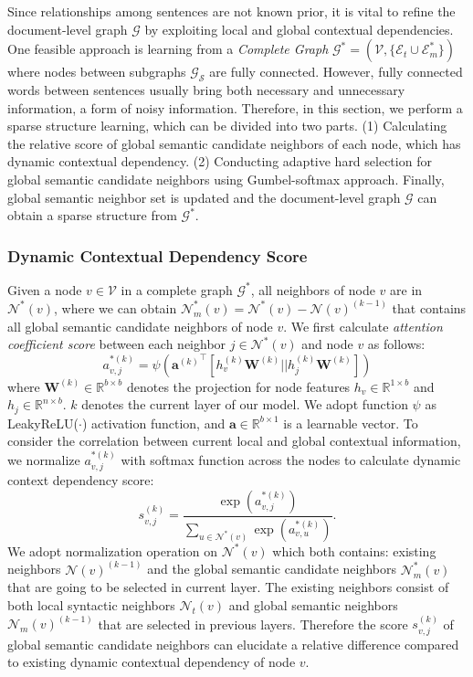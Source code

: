 \documentclass[letterpaper]{article} %
\begin{document}
Since relationships among sentences are not known prior, it is vital to refine the document-level graph $\mathcal{G}$ by exploiting local and global contextual dependencies. One feasible approach is learning from a  \textit{Complete Graph} $\mathcal{G^*}=(\mathcal{V},\{\mathcal{E}_t \cup{\mathcal{E}_m^*}\})$ where nodes between subgraphs $\mathcal{G}_\mathcal{S}$ are fully connected. However, fully connected words between sentences usually bring both necessary and unnecessary information, a form of noisy information.
Therefore, in this section, we perform a sparse structure learning, which can be divided into two parts.
(1) Calculating the relative score of global semantic candidate neighbors of each node, which has dynamic contextual dependency.
(2) Conducting adaptive hard selection for global semantic candidate neighbors using Gumbel-softmax approach. Finally, global semantic neighbor set is updated and the document-level graph $\mathcal{G}$ can obtain a sparse structure from $\mathcal{G}^*$.

\subsubsection{Dynamic Contextual Dependency Score}
Given a node $v \in \mathcal{V}$ in a complete graph $\mathcal{G}^*$,  all neighbors of node $v$ are in $\mathcal{N}^*(v)$, where we can obtain  $\mathcal{N}_m^*(v)=\mathcal{N}^*(v)-\mathcal{N}(v)^{(k-1)}$ that contains all global semantic candidate neighbors of node $v$. We first calculate \textit{attention coefficient score} between each neighbor $j\in\mathcal{N}^*(v)$ and node $v$ as follows:
\begin{equation}
a_{v,j}^{*(k)} = \psi\left({\mathbf{a}^{(k)}}^{\top}[h_{v}^{(k)}\mathbf{W}^{(k)}||h_{j}^{(k)}\mathbf{W}^{(k)}]\right)
\end{equation}
where $\mathbf{W}^{(k)}\in\mathbb{R}^{b\times{b}}$ denotes the projection for node features $h_v\in\mathbb{R}^{1\times{b}}$ and $h_j\in\mathbb{R}^{n\times{b}}$. $k$ denotes the current layer of our model. We adopt function $\psi$ as LeakyReLU($\cdot$) activation function, and $\mathbf{a}\in\mathbb{R}^{b\times{1}}$ is a learnable vector.
To consider the correlation between current local and global contextual information, we normalize $a_{v,j}^{*(k)}$ with softmax function across the nodes to calculate dynamic context dependency score:
\begin{equation}
s_{v,j}^{(k)} = \frac{\exp(a_{v,j}^{*(k)})}{\sum_{u\in\mathcal{N}^*(v)}{\exp(a_{v,u}^{*(k)})}}.
\end{equation}
We adopt normalization operation on $\mathcal{N}^*(v)$ which both contains: existing neighbors $\mathcal{N}(v)^{(k-1)}$ and the global semantic candidate neighbors $\mathcal{N}^*_m(v)$ that are going to be selected in current layer. The existing neighbors consist of both local syntactic neighbors $\mathcal{N}_t(v)$ and global semantic neighbors $\mathcal{N}_m(v)^{(k-1)}$ that are selected in previous layers. Therefore the score $s_{v,j}^{(k)}$ of global semantic candidate neighbors can elucidate a relative difference compared to existing dynamic contextual dependency of node $v$.
\end{document}
